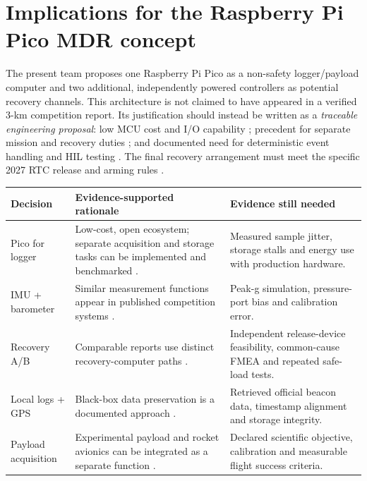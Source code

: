 \documentclass[10pt,a4paper]{article}
\begin{document}
\section{Implications for the Raspberry Pi Pico MDR concept}
The present team proposes one Raspberry Pi Pico as a non-safety logger/payload computer and two additional, independently powered controllers as potential recovery channels. This architecture is not claimed to have appeared in a verified 3-km competition report. Its justification should instead be written as a \emph{traceable engineering proposal}: low MCU cost and I/O capability \cite{rpicopico}; precedent for separate mission and recovery duties \cite{astg2022aves2}; and documented need for deterministic event handling and HIL testing \cite{netzel2026}. The final recovery arrangement must meet the specific 2027 RTC release and arming rules \cite{rtc2027rules}.

\begin{tabularx}{\linewidth}{@{}L{32mm}Y L{45mm}@{}}
\toprule{}\textbf{Decision} & \textbf{Evidence-supported rationale} & \textbf{Evidence still needed}\\\midrule
Pico for logger & Low-cost, open ecosystem; separate acquisition and storage tasks can be implemented and benchmarked \cite{rpicopico}. & Measured sample jitter, storage stalls and energy use with production hardware.\\
IMU + barometer & Similar measurement functions appear in published competition systems \cite{astg2021aves,astg2022aves2}. & Peak-g simulation, pressure-port bias and calibration error.\\
Recovery A/B & Comparable reports use distinct recovery-computer paths \cite{astg2022aves2}. & Independent release-device feasibility, common-cause FMEA and repeated safe-load tests.\\
Local logs + GPS & Black-box data preservation is a documented approach \cite{astg2021aves,netzel2026}. & Retrieved official beacon data, timestamp alignment and storage integrity.\\
Payload acquisition & Experimental payload and rocket avionics can be integrated as a separate function \cite{astg2021aves,bakirci2022}. & Declared scientific objective, calibration and measurable flight success criteria.\\
\bottomrule
\end{tabularx}
\end{document}
